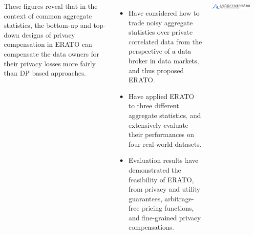 \documentclass[25pt, portrait]{tikzposter}
\begin{document}
\begin{columns}
{       
       {
          These figures reveal that in the context of common aggregate statistics, the bottom-up and top-down designs of privacy compensation in ERATO can compensate the data owners for their privacy losses more fairly than DP based approaches.
       }
       \vspace{-.2cm}
   }
   {
  	\vspace{-.3cm}
	\begin{itemize}[labelsep=\font]
      \item Have considered how to trade noisy aggregate statistics over private correlated data  from the perspective of a data broker in data markets, and thus proposed ERATO.
      \item Have applied ERATO to three different aggregate statistics, and extensively evaluate their performances on four real-world datasets.
      \item Evaluation results have demonstrated the feasibility of ERATO, from privacy and utility guarantees, arbitrage-free pricing functions, and fine-grained privacy compensations.
	\end{itemize}
    \begin{center}
    	\includegraphics[width=0.7\colwidth]{images/logo.png}
    \end{center}
     \vspace{-.6cm}
  }
\end{columns}
\end{document}
